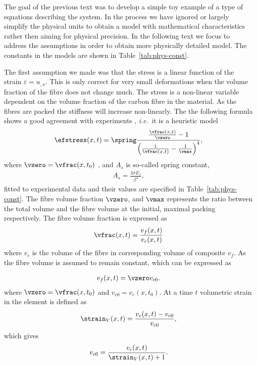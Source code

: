 \documentclass[twoside,a4paper,12pt]{article}
\newcommand{\tabref}[1]{Table~\ref{#1}}
\newcommand{\ie}{{\it i.e.\ }}
\newcommand{\note}[1]{}
\begin{document}
The goal of the previous text was to develop a simple toy example of a
type of equations describing the system. In the process we have ignored
or largely simplify the physical units to obtain a model with
mathematical characteristics rather then aiming for physical
precision. In the following text we focus to address the assumptions
in order to obtain more physically detailed model. The constants in the
models are shown in \tabref{tab:phys-const}.

The first assumption we made was that the stress is a linear function
of the strain $\varepsilon = u_{,x}$. This is only correct for very
small deformations when the volume fraction of the fibre does not
change much.  The stress is a non-linear variable dependent on the
volume fraction of the carbon fibre in the material. As the fibres are
packed the stiffness will increase non-linearly. The the following
formula shows a good agreement with experiments \citet{Gutowski1987},
\ie it is a heuristic model
% 
\begin{align}
  \efstress(x,t) = \spring
  \frac{\frac{\vfrac(x,t)}{\vzero} -1}{\left(\frac{1}{\vfrac(x,t)} -\frac{1}{\vmax}\right)^4}, \label{eq:stress-nonlin}
\end{align}
%
where $\vzero = \vfrac(x,t_0)$ \note{which is assumed to be constant
  throughout the space $x$}, and $A_s$ is so-called spring
constant\note{reference for the expression of spring constant? In the
  \citet{Gutowski1987} only $A_s$ is specified.},
%
\begin{align}
  A_s = \frac{3\pi E_f}{\beta^4},
\end{align}
%
fitted to experimental data and their values are specified in
\tabref{tab:phys-const}.
%
The fibre volume fraction $\vzero$, and $\vmax$ represents the ratio
between the total volume and the fibre volume at the initial, maximal
packing respectively. The fibre volume fraction is expressed as
\begin{align}
  \vfrac(x,t) = \frac{v_f(x,t)}{v_c(x,t)}
\end{align}
%
where $v_c$ is the volume of the fibre in corresponding volume of
composite $v_f$. As the fibre volume is assumed to remain constant,
which can be expressed as
%
\note{is this assmuption reasonable? What about the compression of the fibre?}
%
\begin{align}
  v_f(x,t) = \vzero v_{c0}. \label{eq:fibre-fraction}
\end{align}
where $\vzero = \vfrac(x,t_0)$ and $v_{c0} = v_c(x,t_0)$.
%
At a time $t$ volumetric strain in the element is defined as
\begin{align}
  \strain_V(x,t) = \frac{v_c(x,t) - v_{c0}}{v_{c0}}, \label{eq:volumetric-strain}
\end{align}
which gives
%
\begin{align}
{v_{c0}}= \frac{v_c(x,t) }{\strain_V(x,t) + 1}. \label{eq:initial-volume}
\end{align}
\end{document}
